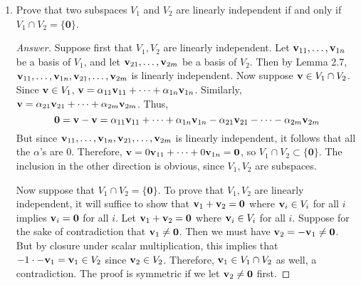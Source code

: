 \documentclass[../psets.tex]{subfiles}
\begin{document}
\begin{enumerate}[label={\textbf{2.\arabic*.}}]
\begin{enumerate}
        \begin{proof}[Answer]
            Yes. A basis of the $n\times n$ symmetric matrices includes all of the matrices that are zero everywhere except for one 1 in a diagonal entry, and all of the matrices that are zero everywhere except for two 1's in off-diagonal symmetric positions. There are $\frac{n}{2}(n+1)$ of these basis "vectors." A basis of the $n\times n$ antisymmetric matrices includes all of the matrices that are zero everywhere except for a $-1$ in an off-diagonal position in the upper triangle and a 1 in the symmetric position in the lower triangle. There are $\frac{n}{2}(n-1)$ of these. Together, we have
            \begin{equation*}
                \frac{n}{2}(n+1)+\frac{n}{2}(n-1) = n^2
            \end{equation*}
            basis "vectors," meaning that we have a complete eigenbasis of $M_{n\times n}$.
        \end{proof}
    \end{enumerate}
    \item Prove that two subspaces $V_1$ and $V_2$ are linearly independent if and only if $V_1\cap V_2=\{\bm{0}\}$.
    \begin{proof}[Answer]
        Suppose first that $V_1,V_2$ are linearly independent. Let $\mathbf{v}_{11},\dots,\mathbf{v}_{1n}$ be a basis of $V_1$, and let $\mathbf{v}_{21},\dots,\mathbf{v}_{2m}$ be a basis of $V_2$. Then by Lemma 2.7, $\mathbf{v}_{11},\dots,\mathbf{v}_{1n},\mathbf{v}_{21},\dots,\mathbf{v}_{2m}$ is linearly independent. Now suppose $\mathbf{v}\in V_1\cap V_2$. Since $\mathbf{v}\in V_1$, $\mathbf{v}=\alpha_{11}\mathbf{v}_{11}+\cdots+\alpha_{1n}\mathbf{v}_{1n}$. Similarly, $\mathbf{v}=\alpha_{21}\mathbf{v}_{21}+\cdots+\alpha_{2m}\mathbf{v}_{2m}$. Thus,
        \begin{equation*}
            \bm{0} = \mathbf{v}-\mathbf{v} = \alpha_{11}\mathbf{v}_{11}+\cdots+\alpha_{1n}\mathbf{v}_{1n}-\alpha_{21}\mathbf{v}_{21}-\cdots-\alpha_{2m}\mathbf{v}_{2m}
        \end{equation*}
        But since $\mathbf{v}_{11},\dots,\mathbf{v}_{1n},\mathbf{v}_{21},\dots,\mathbf{v}_{2m}$ is linearly independent, it follows that all the $\alpha$'s are 0. Therefore, $\mathbf{v}=0\mathbf{v}_{11}+\cdots+0\mathbf{v}_{1n}=\bm{0}$, so $V_1\cap V_2\subset\{\bm{0}\}$. The inclusion in the other direction is obvious, since $V_1,V_2$ are subspaces.\par
        Now suppose that $V_1\cap V_2=\{\bm{0}\}$. To prove that $V_1,V_2$ are linearly independent, it will suffice to show that $\mathbf{v}_1+\mathbf{v}_2=\bm{0}$ where $\mathbf{v}_i\in V_i$ for all $i$ implies $\mathbf{v}_i=\bm{0}$ for all $i$. Let $\mathbf{v}_1+\mathbf{v}_2=\bm{0}$ where $\mathbf{v}_i\in V_i$ for all $i$. Suppose for the sake of contradiction that $\mathbf{v}_1\neq\bm{0}$. Then we must have $\mathbf{v}_2=-\mathbf{v}_1\neq\bm{0}$. But by closure under scalar multiplication, this implies that $-1\cdot-\mathbf{v}_1=\mathbf{v}_1\in V_2$ since $\mathbf{v}_2\in V_2$. Therefore, $\mathbf{v}_1\in V_1\cap V_2$ as well, a contradiction. The proof is symmetric if we let $\mathbf{v}_2\neq\bm{0}$ first.
    \end{proof}
\end{enumerate}
\end{document}
